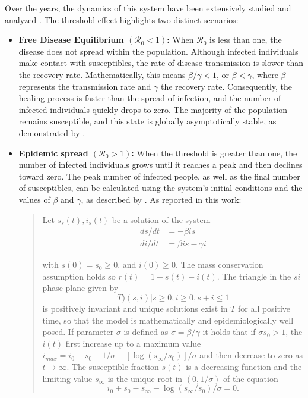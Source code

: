 Over the years, the dynamics of this system have been extensively studied and analyzed \cite{Breda_2012, akinboro2014numerical, Jard_n_Kojakhmetov_2021, Ledder_2023, Okabe_2020, Prodanov_2022, Xu_2014, Turkyilmazoglu_2021}. The threshold effect highlights two distinct scenarios:
\begin{itemize}
	\item \textbf{Free Disease Equilibrium $(\mathcal{R}_0 < 1)$:} When $\mathcal{R}_0$ is less than one, the disease does not spread within the population. Although infected individuals make contact with susceptibles, the rate of disease transmission is slower than the recovery rate. Mathematically, this means $\beta / \gamma < 1$, or $\beta < \gamma$, where $\beta$ represents the transmission rate and $\gamma$ the recovery rate. Consequently, the healing process is faster than the spread of infection, and the number of infected individuals quickly drops to zero. The majority of the population remains susceptible, and this state is globally asymptotically stable, as demonstrated by \cite{Hernandez_Vargas_2022}.
	\item \textbf{Epidemic spread $(\mathcal{R}_0 > 1)$:}     When the threshold is greater than one, the number of infected individuals grows until it reaches a peak and then declines toward zero. The peak number of infected people, as well as the final number of susceptibles, can be calculated using the system's initial conditions and the values of $\beta$ and $\gamma$, as described by \cite{Hethcote_2000}. 
	As reported in this work:
	\begin{quotation}\small
	Let $s_s(t),i_s(t)$ be a solution of the system 
	\begin{equation}
		\begin{split} 
			ds/dt &= -\beta i s\\
			di/dt &= \beta i s - \gamma i	
		\end{split}
	\end{equation}

	with $s(0) = s_0 \ge 0$, and $i(0) \ge 0$. The mass conservation assumption holds so $r(t) = 1-s(t)-i(t)$. The triangle in the $si$ phase plane given by 
	\[T ) {(s,i)|s \ge 0, i\ge 0, s+i \le 1 }\]
	is positively invariant and unique solutions exist in $T$ for all positive time, so that the
	model is mathematically and epidemiologically well posed.
	If parameter $\sigma$ is defined as $\sigma=\beta/\gamma$ it holds that if $\sigma s_0 >1$, the $i(t)$ first increase up to a maximum value $i_{max} = i_0 + s_0 - 1/\sigma - [\log(s_\infty/s_0)]/\sigma $ and then decrease to zero as $t \rightarrow \infty$. The susceptible fraction $s(t)$ is a decreasing function and the limiting value $s_\infty$ is the
	unique root in $(0, 1/\sigma)$ of the equation
	\[
	i_0 + s_0 -s_\infty - \log(s_\infty/s_0)/\sigma = 0. 
	\]		
	\end{quotation}
	

\end{itemize}
